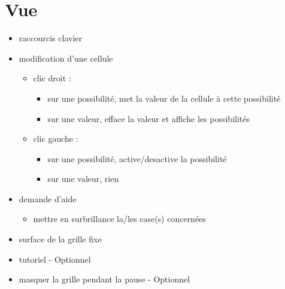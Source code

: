 \documentclass[a4paper,10pt]{report}
\begin{document}
\section*{Vue}

\begin{itemize}
 \item raccourcis clavier
 \item modification d'une cellule
 \begin{itemize}
  \item clic droit :
  \begin{itemize}
   \item sur une possibilité, met la valeur de la cellule à cette possibilité
   \item sur une valeur, efface la valeur et affiche les possibilités
  \end{itemize}
  \item clic gauche :
  \begin{itemize}
   \item sur une possibilité, active/desactive la possibilité
   \item sur une valeur, rien
  \end{itemize}
 \end{itemize}
 \item demande d'aide
 \begin{itemize}
  \item mettre en surbrillance la/les case(s) concernées
 \end{itemize}
 \item surface de la grille fixe
 \item tutoriel - Optionnel
 \item masquer la grille pendant la pause - Optionnel
 
\end{itemize}
\end{document}
